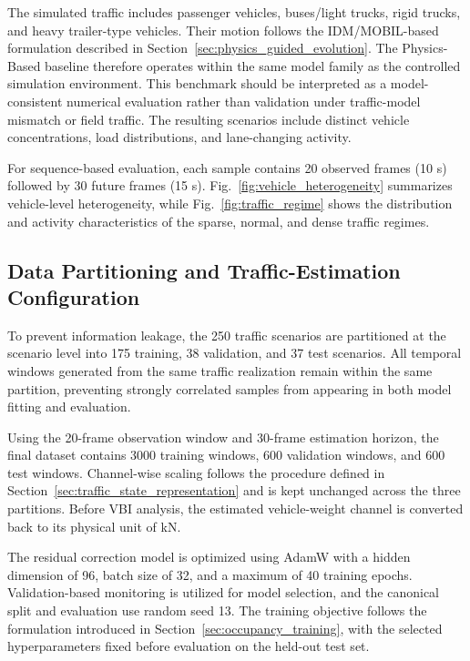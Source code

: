 \documentclass[journal]{IEEEtran}
\begin{document}
The simulated traffic includes passenger vehicles, buses/light trucks, rigid trucks, and heavy trailer-type vehicles. Their motion follows the IDM/MOBIL-based formulation described in Section~\ref{sec:physics_guided_evolution}. The Physics-Based baseline therefore operates within the same model family as the controlled simulation environment. This benchmark should be interpreted as a model-consistent numerical evaluation rather than validation under traffic-model mismatch or field traffic. The resulting scenarios include distinct vehicle concentrations, load distributions, and lane-changing activity.

For sequence-based evaluation, each sample contains 20 observed frames (10 s) followed by 30 future frames (15 s). Fig.~\ref{fig:vehicle_heterogeneity} summarizes vehicle-level heterogeneity, while Fig.~\ref{fig:traffic_regime} shows the distribution and activity characteristics of the sparse, normal, and dense traffic regimes.


\subsection{Data Partitioning and Traffic-Estimation Configuration}

To prevent information
leakage, the 250 traffic scenarios are partitioned at the scenario level into
175 training, 38 validation, and 37 test scenarios. All temporal windows
generated from the same traffic realization remain within the same partition,
preventing strongly correlated samples from appearing in both model fitting and
evaluation.

Using the 20-frame
observation window and 30-frame estimation horizon, the final dataset contains
3000 training windows, 600 validation windows, and 600 test windows.
Channel-wise scaling follows the procedure defined in Section~\ref{sec:traffic_state_representation} and is kept
unchanged across the three partitions. Before VBI analysis, the estimated
vehicle-weight channel is converted back to its physical unit of kN.

The residual correction
model is optimized using AdamW with a hidden dimension of 96, batch size of 32,
and a maximum of 40 training epochs. Validation-based monitoring is utilized
for model selection, and the canonical split and evaluation use random seed 13.
The training objective follows the formulation introduced in Section~\ref{sec:occupancy_training},
with the selected hyperparameters fixed before evaluation on the held-out test
set.
\end{document}
